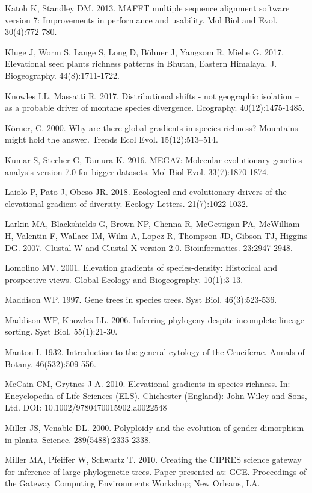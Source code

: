 Katoh K, Standley DM. 2013. MAFFT multiple sequence alignment software version 7: Improvements in performance and usability.  Mol Biol and Evol. 30(4):772-780.

Kluge J, Worm S, Lange S, Long D, Böhner J, Yangzom R, Miehe G. 2017. Elevational seed plants richness patterns in Bhutan, Eastern Himalaya. J. Biogeography. 44(8):1711-1722.

Knowles LL, Massatti R. 2017. Distributional shifts - not geographic isolation – as a probable driver of montane species divergence. Ecography. 40(12):1475-1485.

Körner, C. 2000. Why are there global gradients in species richness? Mountains might hold the answer. Trends Ecol Evol. 15(12):513–514.

Kumar S, Stecher G, Tamura K. 2016. MEGA7: Molecular evolutionary genetics analysis version 7.0 for bigger datasets. Mol Biol Evol. 33(7):1870-1874.

Laiolo P, Pato J, Obeso JR. 2018. Ecological and evolutionary drivers of the elevational gradient of diversity. Ecology Letters. 21(7):1022-1032.

Larkin MA, Blackshields G, Brown NP, Chenna R, McGettigan PA, McWilliam H, Valentin F, Wallace IM, Wilm A, Lopez R, Thompson JD, Gibson TJ, Higgins DG. 2007. Clustal W and Clustal X version 2.0. Bioinformatics. 23:2947-2948.

Lomolino MV. 2001. Elevation gradients of species-density: Historical and prospective views. Global Ecology and Biogeography. 10(1):3-13.

Maddison WP. 1997. Gene trees in species trees. Syst Biol. 46(3):523-536.

Maddison WP, Knowles LL. 2006. Inferring phylogeny despite incomplete lineage sorting. Syst Biol. 55(1):21-30.

Manton I. 1932. Introduction to the general cytology of the Cruciferae. Annals of Botany. 46(532):509-556.

McCain CM, Grytnes J-A. 2010. Elevational gradients in species richness. In: Encyclopedia of Life Sciences (ELS). Chichester (England): John Wiley and Sons, Ltd.  DOI: 10.1002/9780470015902.a0022548

Miller JS, Venable DL. 2000. Polyploidy and the evolution of gender dimorphism in plants. Science. 289(5488):2335-2338.

Miller MA, Pfeiffer W, Schwartz T. 2010. Creating the CIPRES science gateway for inference of large phylogenetic trees. Paper presented at: GCE. Proceedings of the Gateway Computing Environments Workshop; New Orleans, LA.

